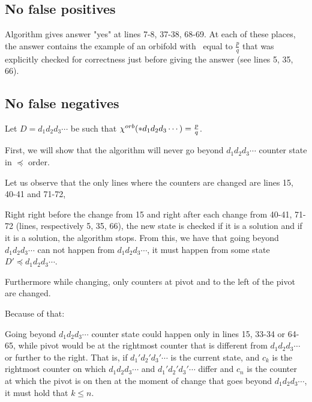 \subsection{No false positives}
Algorithm gives answer "yes" at lines 7-8, 37-38, 68-69. At each of these places, 
the answer contains the example of an orbifold with \Eoc\ equal to $\frac{p}{q}$ that was 
explicitly checked for correctness just before giving the answer (see lines 5, 35, 66). 
\subsection{No false negatives}
Let $D = d_1d_2d_3\cdots$ be such that ${\chi^{orb}(*d_1d_2d_3\cdots)} = \frac{p}{q}$. 

%

First, we will show that the algorithm will never 
go beyond $d_1d_2d_3\cdots$ counter state in $\preceq$ order. 

Let us observe that the only lines where 
the counters are changed are lines 15, 40-41 and 71-72, 

Right right before 
the change from 15 and right after each change from 40-41, 71-72 
(lines, respectively 5, 35, 66), 
the new state is checked if it is a solution and 
if it is a solution, the algorithm stops. From this, we 
have that going beyond $d_1d_2d_3\cdots$ can not happen from $d_1d_2d_3\cdots$, 
it must happen from some state $D' \preceq d_1d_2d_3\cdots$.

Furthermore while changing, 
only counters 
at pivot and to the left of the pivot are changed. 

Because of that:
\begin{observation}\label{position of pointer observation}
Going beyond $d_1d_2d_3\cdots$ counter state 
could happen only in lines 15, 33-34 or 64-65, while pivot would be 
at the rightmost counter that is different from $d_1d_2d_3\cdots$ or further to the right. 
That is, if $d_1'd_2'd_3'\cdots$ is the current state, and 
$c_k$ is the rightmost counter on which $d_1d_2d_3\cdots$ 
and $d_1'd_2'd_3'\cdots$ differ and $c_n$ is the counter at which the pivot is on then 
at the moment of change that goes beyond $d_1d_2d_3\cdots$, it must hold that $k \leq n$.
\end{observation}

